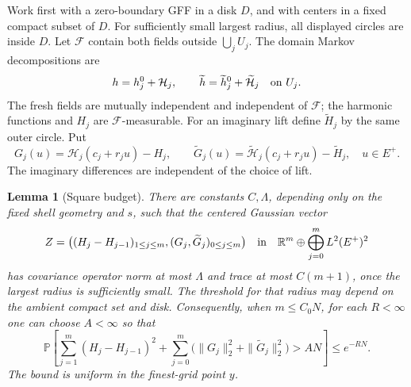 \documentclass[11pt]{article}
\numberwithin{equation}{section}
\newtheorem{lemma}[theorem]{Lemma}
\theoremstyle{definition}
\theoremstyle{remark}
\newcommand{\R}{\mathbb R}
\newcommand{\PP}{\mathbb P}
\newcommand{\1}{\mathbf 1}
\begin{document}
Work first with a zero-boundary GFF in a disk \(D\), and with
centers in a fixed compact subset of \(D\).  For sufficiently small
largest radius, all displayed circles are inside \(D\).
Let \(\mathcal F\) contain both fields outside \(\bigcup_jU_j\).
The domain Markov decompositions are
\[
 h=h_j^0+\mathcal H_j,\qquad
 \widetilde h=\widetilde h_j^0+\widetilde{\mathcal H}_j
 \quad\hbox{on }U_j.
\]
The fresh fields are mutually independent and independent of
\(\mathcal F\); the harmonic functions and \(H_j\) are
\(\mathcal F\)-measurable.  For an imaginary lift define
\(\widetilde H_j\) by the same outer circle.  Put
\[
 G_j(u)=\mathcal H_j(c_j+r_ju)-H_j,\qquad
 \widetilde G_j(u)=
   \widetilde{\mathcal H}_j(c_j+r_ju)-\widetilde H_j,
 \quad u\in E^+.
\]
The imaginary differences are independent of the choice of lift.

\begin{lemma}[Square budget]\label{ann:gaussian-budget}
There are constants \(C,\Lambda\), depending only on the fixed
shell geometry and \(s\), such that the centered Gaussian vector
\[
 Z=\bigl((H_j-H_{j-1})_{1\le j\le m},
              (G_j,\widetilde G_j)_{0\le j\le m}\bigr)
 \quad\hbox{in}\quad
 \R^m\oplus\bigoplus_{j=0}^m L^2(E^+)^2
\]
has covariance operator norm at most \(\Lambda\) and trace at most
\(C(m+1)\), once the largest radius is sufficiently small.
The threshold for that radius may depend on the ambient compact set
and disk.  Consequently, when \(m\le C_0N\), for each \(R<\infty\)
one can choose \(A<\infty\) so that
\begin{equation}
 \PP\left[
  \sum_{j=1}^m(H_j-H_{j-1})^2+
  \sum_{j=0}^m\bigl(\|G_j\|_2^2+\|\widetilde G_j\|_2^2\bigr)
       >AN\right]\le e^{-RN}.
 \label{ann:square-tail}
\end{equation}
The bound is uniform in the finest-grid point \(y\).
\end{lemma}
\end{document}
